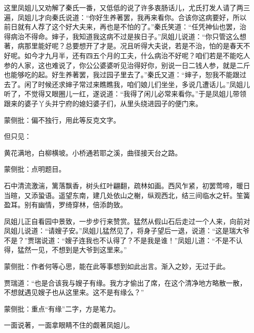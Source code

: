 \begin{parag}


    这里凤姐儿又劝解了秦氏一番，又低低的说了许多衷肠话儿，尤氏打发人请了两三遍，凤姐儿才向秦氏说道：“你好生养著罢，我再来看你。合该你这病要好，所以前日就有人荐了这个好大夫来，再也是不怕的了。”秦氏笑道：“任凭神仙也罢，治得病治不得命。婶子，我知道我这病不过是挨日子。”凤姐儿说道：“你只管这么想著，病那里能好呢？总要想开了才是。况且听得大夫说，若是不治，怕的是春天不好呢。如今才九月半，还有四五个月的工夫，什么病治不好呢？咱们若是不能吃人参的人家，这也难说了，你公公婆婆听见治得好你，别说一日二钱人参，就是二斤也能够吃的起。好生养著罢，我过园子里去了。”秦氏又道：“婶子，恕我不能跟过去了。闲了时候还求婶子常过来瞧瞧我，咱们娘儿们坐坐，多说几遭话儿。”凤姐儿听了，不觉得又眼圈儿一红，遂说道：“我得了闲儿必常来看你。”于是凤姐儿带领跟来的婆子丫头并宁府的媳妇婆子们，从里头绕进园子的便门来。\begin{note}蒙侧批：偏不独行，用此等反克文字。\end{note}但只见：
\end{parag}
\begin{qute2sp}
    黄花满地，白柳横坡。小桥通若耶之溪，曲径接天台之路。\begin{note}蒙侧批：点明题目。\end{note}石中清流激湍，篱落飘香，树头红叶翩翻，疏林如画。西风乍紧，初罢莺啼，暖日当暄，又添蛩语。遥望东南，建几处依山之榭，纵观西北，结三间临水之轩。笙簧盈耳。别有幽情，罗绮穿林，倍添韵致。
\end{qute2sp}
\begin{parag}

    凤姐儿正自看园中景致，一步步行来赞赏。猛然从假山石后走过一个人来，向前对凤姐儿说道：“请嫂子安。”凤姐儿猛然见了，将身子望后一退，说道：“这是瑞大爷不是？”贾瑞说道：“嫂子连我也不认得了？不是我是谁！”凤姐儿道：“不是不认得，猛然一见，不想到是大爷到这里来。”\begin{note}蒙侧批：作者何等心思，能在此等事想到如此出言。渐入之妙，无过于此。\end{note}贾瑞道：“也是合该我与嫂子有缘。我方才偷出了席，在这个清净地方略散一散，不想就遇见嫂子也从这里来。这不是有缘么？”\begin{note}蒙侧批：重点“有缘”二字，方是笔力。\end{note}一面说著，一面拿眼睛不住的觑著凤姐儿。
\end{parag}


